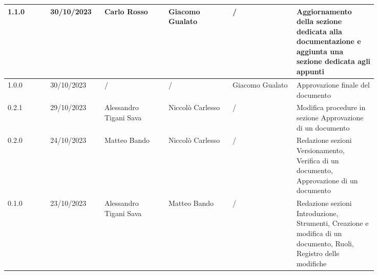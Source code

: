 {\begin{tabular}{p{0.10\linewidth}p{0.10\linewidth}p{0.15\linewidth}p{0.15\linewidth}p{0.15\linewidth}p{0.19\linewidth}}
	  \hline
	  1.1.0             & 30/10/2023    & Carlo Rosso            & Giacomo Gualato       & /                    & Aggiornamento della sezione dedicata alla documentazione e aggiunta una sezione dedicata agli appunti                                    \\
	  \hline
	  1.0.0             & 30/10/2023    & /                      & /                     & Giacomo Gualato      & Approvazione finale del documento                                                                                                        \\
	  \hline
	  0.2.1             & 29/10/2023    & Alessandro Tigani Sava & Niccolò Carlesso      & /                    & Modifica procedure in sezione Approvazione di un documento                                                                               \\
	  \hline
	  0.2.0             & 24/10/2023    & Matteo Bando           & Niccolò Carlesso      & /                    & Redazione sezioni Versionamento, Verifica di un documento, Approvazione di un documento                                                  \\
	  \hline
	  0.1.0             & 23/10/2023    & Alessandro Tigani Sava & Matteo Bando          & /                    & Redazione sezioni Introduzione, Strumenti, Creazione e modifica di un documento, Ruoli, Registro delle modifiche                         \\
	  \hline
  \end{tabular}
 }

